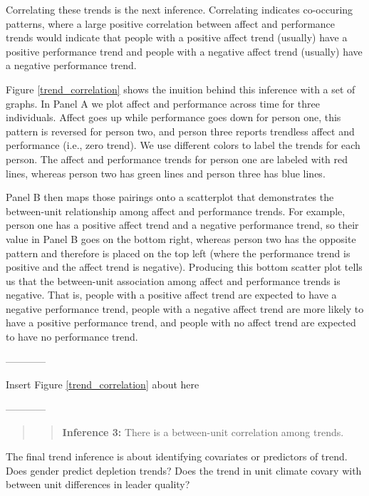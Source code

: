 \documentclass[english,,man]{apa6}
\theoremstyle{definition}
\theoremstyle{definition}
\theoremstyle{definition}
\theoremstyle{remark}
\begin{document}
Correlating these trends is the next inference. Correlating indicates
co-occuring patterns, where a large positive correlation between affect
and performance trends would indicate that people with a positive affect
trend (usually) have a positive performance trend and people with a
negative affect trend (usually) have a negative performance trend.

Figure \ref{trend_correlation} shows the inuition behind this inference
with a set of graphs. In Panel A we plot affect and performance across
time for three individuals. Affect goes up while performance goes down
for person one, this pattern is reversed for person two, and person
three reports trendless affect and performance (i.e., zero trend). We
use different colors to label the trends for each person. The affect and
performance trends for person one are labeled with red lines, whereas
person two has green lines and person three has blue lines.

Panel B then maps those pairings onto a scatterplot that demonstrates
the between-unit relationship among affect and performance trends. For
example, person one has a positive affect trend and a negative
performance trend, so their value in Panel B goes on the bottom right,
whereas person two has the opposite pattern and therefore is placed on
the top left (where the performance trend is positive and the affect
trend is negative). Producing this bottom scatter plot tells us that the
between-unit association among affect and performance trends is
negative. That is, people with a positive affect trend are expected to
have a negative performance trend, people with a negative affect trend
are more likely to have a positive performance trend, and people with no
affect trend are expected to have no performance trend.

\begin{center}

------------

Insert Figure \ref{trend_correlation} about here

------------

\end{center}

\begin{quote}
\begin{quote}
\textbf{Inference 3:} There is a between-unit correlation among trends.
\end{quote}
\end{quote}

The final trend inference is about identifying covariates or predictors
of trend. Does gender predict depletion trends? Does the trend in unit
climate covary with between unit differences in leader quality?
\end{document}
